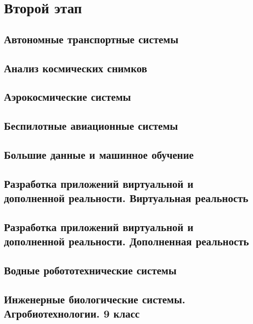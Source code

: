 \part{Второй этап}

\chapter{Автономные транспортные системы}


\chapter{Анализ космических снимков}


\chapter{Аэрокосмические системы}


\chapter{Беспилотные авиационные системы}


\chapter{Большие данные и машинное обучение}


\chapter{Разработка приложений виртуальной и дополненной реальности. Виртуальная реальность}


\chapter{Разработка приложений виртуальной и дополненной реальности. Дополненная реальность}


\chapter{Водные робототехнические системы}


\chapter{Инженерные биологические системы. Агробиотехнологии. 9 класс}


